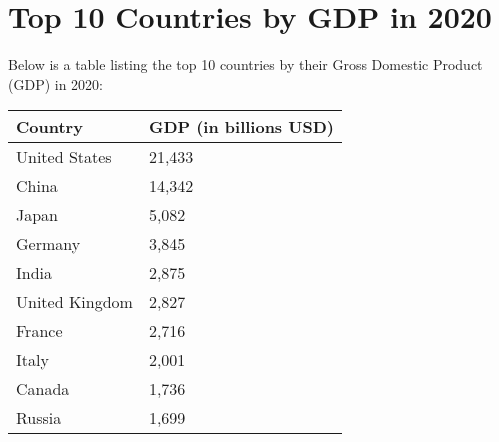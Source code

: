 \documentclass{article}
\begin{document}
\section*{Top 10 Countries by GDP in 2020}

Below is a table listing the top 10 countries by their Gross Domestic Product (GDP) in 2020:

\begin{table}[ht]
\centering
\begin{tabular}{@{}ll@{}}
\toprule
Country       & GDP (in billions USD) \\ \midrule
United States & 21,433 \\
China         & 14,342 \\
Japan         & 5,082 \\
Germany       & 3,845 \\
India         & 2,875 \\
United Kingdom& 2,827 \\
France        & 2,716 \\
Italy         & 2,001 \\
Canada        & 1,736 \\
Russia        & 1,699 \\ \bottomrule
\end{tabular}
\end{table}
\end{document}

